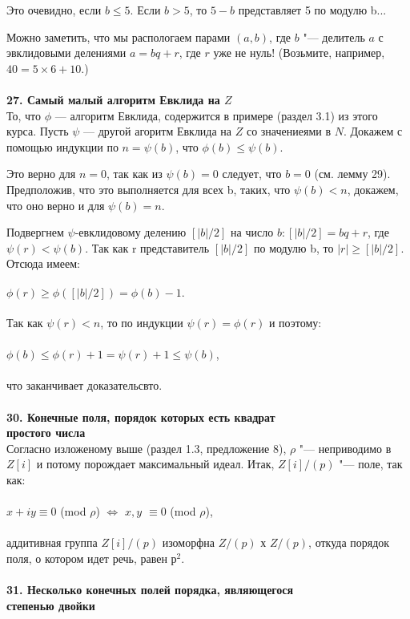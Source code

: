 \documentclass{book}
\begin{document}
\newpage
\setcounter{thesection}{289}
Это очевидно, если $b \leq 5$. Если $b > 5$, то $5 - b$ представляет 5 по
модулю b...


Можно заметить, что мы распологаем парами $(a,b)$, где $b$ "--- делитель
$a$ с эвклидовыми делениями $a = bq + r$, где $r$ уже не нуль! (Возьмите,
например, $40 = 5 \times 6 + 10$.)\\
\\
\textbf{27. Самый малый алгоритм Евклида на $Z$}
\\

То, что $\phi$ --- алгоритм Евклида, содержится в примере (раздел 3.1)
из этого курса. Пусть $\psi$ --- другой агоритм Евклида на $Z$ со значениеями
 в $N$. Докажем с помощью индукции по $n =\psi(b)$, что $\phi(b) \leq \psi(b)$.


Это верно для $n = 0$, так как из $\psi(b) = 0$ следует, что $b = 0$
(см. лемму 29). Предположив, что это выполняется для всех b, таких,
что $\psi(b) < n$, докажем, что оно верно и для $\psi(b) = n$.


Подвергнем $\psi$-евклидовому делению $[|b|/2]$ на число $b:[|b|/2] = bq+r$,
где $\psi(r) < \psi(b)$. Так как r представитель $[|b|/2]$ по модулю b, то
$|r| \geq [|b|/2]$. Отсюда имеем:\\
\\
															$\phi(r) \geq \phi([|b|/2]) = \phi(b) - 1.$\\
\\
Так как $\psi(r) < n$, то по индукции $\psi(r) = \phi(r)$ и поэтому:\\
\\
															$\phi(b) \leq \phi(r) + 1 = \psi(r) + 1 \leq \psi(b)$,\\
\\
что заканчивает доказательсвто.\\
\\
\textbf{30. Конечные поля, порядок которых есть квадрат\\
простого числа}\\

Согласно изложеному выше (раздел 1.3, предложение 8), $\rho$ "--- неприводимо 
в $Z[i]$ и потому порождает максимальный идеал. Итак,
$Z[i]/(p)$ "--- поле, так как:\\
\\
									\textit{$x + iy \equiv 0$} (mod $\rho$) $\Longleftrightarrow$ \textit{$x, y$ $\equiv 0$} (mod $\rho $),\\
\\
аддитивная группа $Z[i]/(p)$ изоморфна $Z/(p)$ х $Z/(p)$, откуда порядок
поля, о котором идет речь, равен $р^2$.\\
\\
\textbf{31. Несколько конечных полей порядка, являющегося\\
степенью двойки}\\
\end{document}
